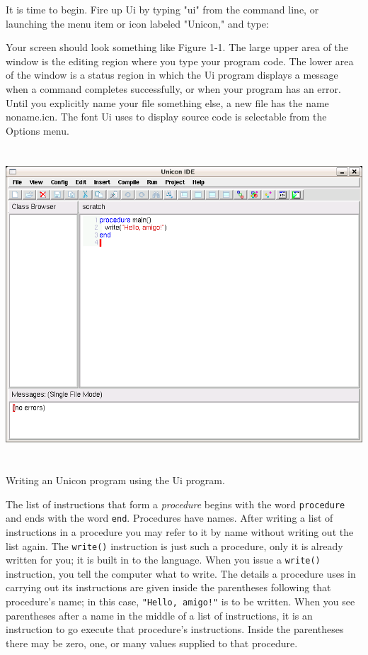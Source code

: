 It is time to begin. Fire up Ui by typing
"ui" from the command line, or launching
the menu item or icon labeled "Unicon," and
type:


Your screen should look something like Figure 1-1. The
large upper area of the window is the editing region where you type
your program code. The lower area of the window is a status region in
which the Ui program displays a message when a command completes
successfully, or when your program has an error. Until you explicitly
name your file something else, a new file has the name
\textsf{noname.icn}. The font Ui uses to display
source code is selectable from the Options menu.

\begin{center}
\includegraphics[width=6in,height=4.5953in]{ub-img/ub-img5.png}
\end{center}
\vspace{-0.25cm}{\sffamily\bfseries Figure 1-1:}
{\sffamily Writing an Unicon program using the Ui program.}

\bigskip

The list of instructions that form a \textit{procedure} begins with
the word \texttt{procedure} and ends with the word
\texttt{end}. Procedures have names. After writing a list of
instructions in a procedure you may refer to it by name without
writing out the list again. The \texttt{write()} instruction is just
such a procedure, only it is already written for you; it is built in
to the language. When you issue a \texttt{write()} instruction, you
tell the computer what to write. The details a procedure uses in
carrying out its instructions are given inside the parentheses
following that procedure's name; in this case, \texttt{"Hello, amigo!"}
is to be written.  When you see parentheses after a name in
the middle of a list of instructions, it is an instruction to go
execute that procedure's instructions. Inside the parentheses there
may be zero, one, or many values supplied to that procedure.

